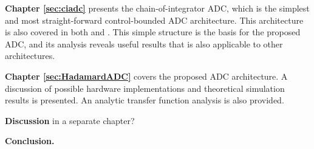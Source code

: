 \textbf{Chapter \ref{sec:ciadc}} presents the chain-of-integrator ADC, which is the simplest and most straight-forward control-bounded ADC architecture. This architecture is also covered in both \cite{cbc_2020_loeliger} and \cite{malmberg_thesis}. This simple structure is the basis for the proposed ADC, and its analysis reveals useful results that is also applicable to other architectures.

\textbf{Chapter \ref{sec:HadamardADC}} covers the proposed ADC architecture. A discussion of possible hardware implementations and theoretical simulation results is presented. An analytic transfer function analysis is also provided.

\textbf{Discussion }in a separate chapter?

\textbf{Conclusion.}

